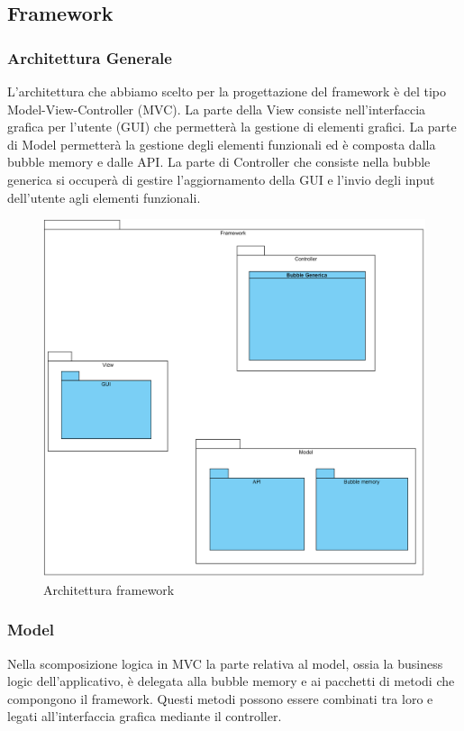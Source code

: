 \subsection{Framework}

\subsubsection{Architettura Generale}
L'architettura che abbiamo scelto per la progettazione del framework è del tipo Model-View-Controller (MVC). La parte della View consiste nell'interfaccia grafica per l'utente (GUI) che permetterà la gestione di elementi grafici. La parte di Model permetterà la gestione degli elementi funzionali ed è composta dalla bubble memory e dalle API. La parte di Controller che consiste nella bubble generica si occuperà di gestire l'aggiornamento della GUI e l'invio degli input dell'utente agli elementi funzionali.

\begin{figure}[H]
	\centering
	\includegraphics[width=14cm]{diagrammi_img/classi_e_package/framework.png}
	\caption{Architettura framework}
\end{figure}

\subsubsection{Model}
Nella scomposizione logica in MVC la parte relativa al model, ossia la business logic dell'applicativo, è delegata alla bubble memory e ai pacchetti di metodi che compongono il framework. Questi metodi possono essere combinati tra loro e legati all'interfaccia grafica mediante il controller.

